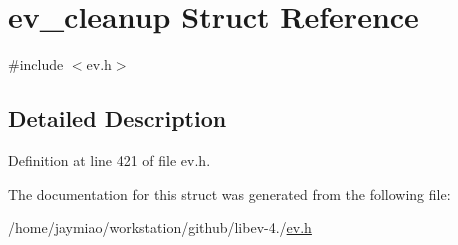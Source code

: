\hypertarget{structev__cleanup}{\section{ev\-\_\-cleanup \-Struct \-Reference}
\label{structev__cleanup}
}


{\ttfamily \#include $<$ev.\-h$>$}



\subsection{\-Detailed \-Description}


\-Definition at line 421 of file ev.\-h.



\-The documentation for this struct was generated from the following file\-:\begin{DoxyCompactItemize}
\item 
/home/jaymiao/workstation/github/libev-\/4./\hyperlink{ev_8h}{ev.\-h}\end{DoxyCompactItemize}
